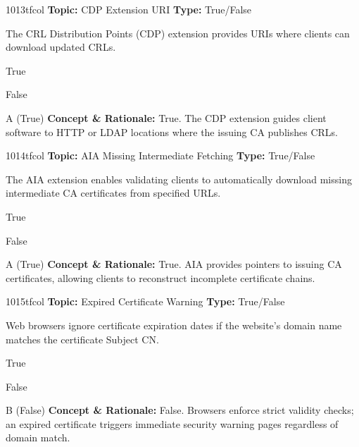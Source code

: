 \begin{qcard}{1013}{tfcol}
\textcolor{darkslate!75}{\small\textbf{Topic:} CDP Extension URI \hfill \textbf{Type:} True/False}\vspace{0.4em}\par
The CRL Distribution Points (CDP) extension provides URIs where clients can download updated CRLs.
\begin{qoptions}
\item True
\item False
\end{qoptions}
\end{qcard}
\nopagebreak
\begin{explainbox}{A (True)}
\textbf{Concept \& Rationale:} True. The CDP extension guides client software to HTTP or LDAP locations where the issuing CA publishes CRLs.
\end{explainbox}

\begin{qcard}{1014}{tfcol}
\textcolor{darkslate!75}{\small\textbf{Topic:} AIA Missing Intermediate Fetching \hfill \textbf{Type:} True/False}\vspace{0.4em}\par
The AIA extension enables validating clients to automatically download missing intermediate CA certificates from specified URLs.
\begin{qoptions}
\item True
\item False
\end{qoptions}
\end{qcard}
\nopagebreak
\begin{explainbox}{A (True)}
\textbf{Concept \& Rationale:} True. AIA provides pointers to issuing CA certificates, allowing clients to reconstruct incomplete certificate chains.
\end{explainbox}

\begin{qcard}{1015}{tfcol}
\textcolor{darkslate!75}{\small\textbf{Topic:} Expired Certificate Warning \hfill \textbf{Type:} True/False}\vspace{0.4em}\par
Web browsers ignore certificate expiration dates if the website's domain name matches the certificate Subject CN.
\begin{qoptions}
\item True
\item False
\end{qoptions}
\end{qcard}
\nopagebreak
\begin{explainbox}{B (False)}
\textbf{Concept \& Rationale:} False. Browsers enforce strict validity checks; an expired certificate triggers immediate security warning pages regardless of domain match.
\end{explainbox}

